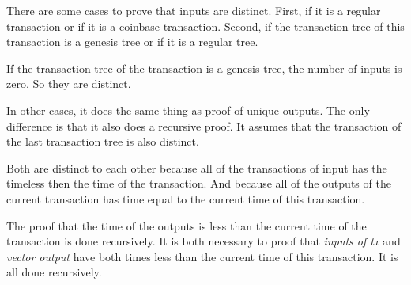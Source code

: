 
There are some cases to prove that inputs are distinct.
First, if it is a regular transaction or if it is a coinbase transaction.
Second, if the transaction tree of this transaction is a genesis tree or if it is a regular tree.

If the transaction tree of the transaction is a genesis tree,
the number of inputs is zero.
So they are distinct.

In other cases, it does the same thing as proof of unique outputs.
The only difference is that it also does a recursive proof.
It assumes that the transaction of the last transaction tree is also distinct.


Both are distinct to each other because all of the transactions of input has the timeless
then the time of the transaction.
And because all of the outputs of the current transaction has time equal to the current time
of this transaction.


The proof that the time of the outputs is less than the current time of the transaction
is done recursively.
It is both necessary to proof that \emph{inputs of tx} and \emph{vector output} have both
times less than the current time of this transaction.
It is all done recursively.
